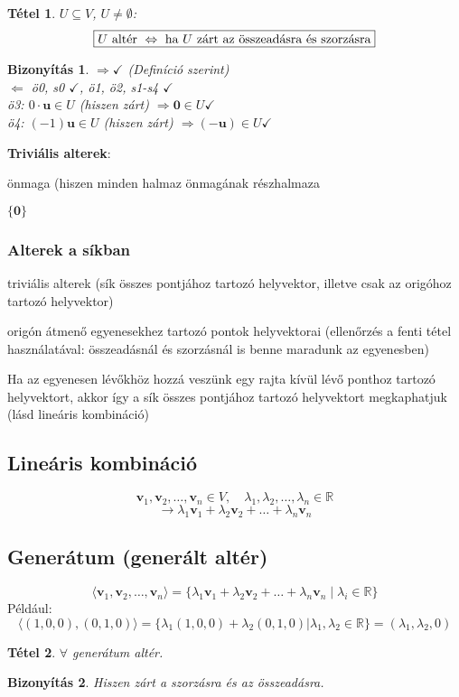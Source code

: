 \documentclass[a4paper,12pt,twoside]{book}
\newcommand{\vek}[1]{\mathbf{#1}} %
\newcommand{\lista}[2]{{#1}_{1}, {#1}_{2}, \ldots, {#1}_{#2}}
\newcommand{\gen}[1]{\langle #1 \rangle}
\newcommand{\linkomb}[3]{#2_1\vek{#1}_{1} + #2_2\vek{#1}_{2} + \ldots + #2_{#3}\vek{#1}_{#3}}
\newcommand{\R}{\mathbb{R}}
\newtheorem{tetel}{Tétel}[chapter]
\newtheorem{biz}{Bizonyítás}[chapter]
\theoremstyle{break}
\newtheorem{bizNL}[biz]{Bizonyítás}
\begin{document}
\begin{tetel}\label{Alter}
  $U\subseteq V$, $U\neq \emptyset$:
\[\boxed{U \hbox{ altér } \Leftrightarrow \hbox{ ha } U \hbox{ zárt az összeadásra és szorzásra}}\]
\end{tetel}
\begin{bizNL}
$\Rightarrow \checkmark$ (Definíció szerint)\\
$\Leftarrow$ ö0, s0 $\checkmark$, ö1, ö2, s1-s4 $\checkmark$\\
ö3: $0\cdot\vek{u} \in U$ (hiszen zárt) $\Rightarrow \vek{0}\in U \checkmark$\\
ö4: $(-1)\vek{u} \in U$ (hiszen zárt) $\Rightarrow (-\vek{u})\in U \checkmark$ 
\end{bizNL}

\textbf{Triviális alterek}:
\begin{enumerate*}
\item önmaga (hiszen minden halmaz önmagának részhalmaza
\item $\{\vek{0}\}$
\end{enumerate*}

\subsubsection{Alterek a síkban}
\begin{itemize*}
\item triviális alterek (sík összes pontjához tartozó helyvektor, illetve csak az origóhoz tartozó helyvektor)
\item origón átmenő egyenesekhez tartozó pontok helyvektorai (ellenőrzés a fenti tétel hasz\-nálatával: összeadásnál és szorzásnál is benne maradunk az egyenesben)
\end{itemize*}
Ha az egyenesen lévőkhöz hozzá veszünk egy rajta kívül lévő ponthoz tartozó helyvektort, akkor így a sík összes pontjához tartozó helyvektort megkaphatjuk (lásd lineáris kombináció)

\subsection{Lineáris kombináció}
\[\lista{\vek{v}}{n} \in V, \quad \lista{\lambda}{n} \in \R\]
\[\rightarrow \boxed{\linkomb{v}{\lambda}{n}}\]

\subsection{Generátum (generált altér)}
\[\gen{\lista{\vek{v}}{n}} = \{\linkomb{v}{\lambda}{n} \;|\; \lambda_i\in\R\}\]
Például:
\[\gen{(1,0,0),(0,1,0)}=\{\lambda_1(1,0,0)+\lambda_2(0,1,0)|\lambda_1,\lambda_2\in\R\}=(\lambda_1,\lambda_2,0)\]
\begin{tetel}
$\forall$ generátum altér.
\end{tetel}
\begin{biz}
 Hiszen zárt a szorzásra és az összeadásra.
\end{biz}
\end{document}
